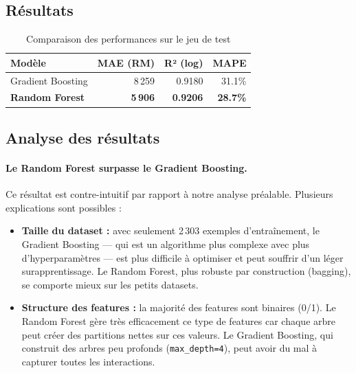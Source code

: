 \documentclass[12pt, a4paper]{article}
\begin{document}
\subsection{Résultats}

\begin{table}[H]
\centering
\begin{tabular}{lrrr}
\toprule
\textbf{Modèle} & \textbf{MAE (RM)} & \textbf{R² (log)} & \textbf{MAPE} \\
\midrule
Gradient Boosting & 8\,259 & 0.9180 & 31.1\% \\
\textbf{Random Forest} & \textbf{5\,906} & \textbf{0.9206} & \textbf{28.7\%} \\
\bottomrule
\end{tabular}
\caption{Comparaison des performances sur le jeu de test}
\end{table}

\subsection{Analyse des résultats}

\paragraph{Le Random Forest surpasse le Gradient Boosting.}
Ce résultat est contre-intuitif par rapport à notre analyse préalable. Plusieurs explications sont possibles :

\begin{itemize}
  \item \textbf{Taille du dataset :} avec seulement 2\,303 exemples d'entraînement, le Gradient Boosting — qui est un algorithme plus complexe avec plus d'hyperparamètres — est plus difficile à optimiser et peut souffrir d'un léger surapprentissage. Le Random Forest, plus robuste par construction (bagging), se comporte mieux sur les petits datasets.
  \item \textbf{Structure des features :} la majorité des features sont binaires (0/1). Le Random Forest gère très efficacement ce type de features car chaque arbre peut créer des partitions nettes sur ces valeurs. Le Gradient Boosting, qui construit des arbres peu profonds (\texttt{max\_depth=4}), peut avoir du mal à capturer toutes les interactions.
\end{itemize}
\end{document}
